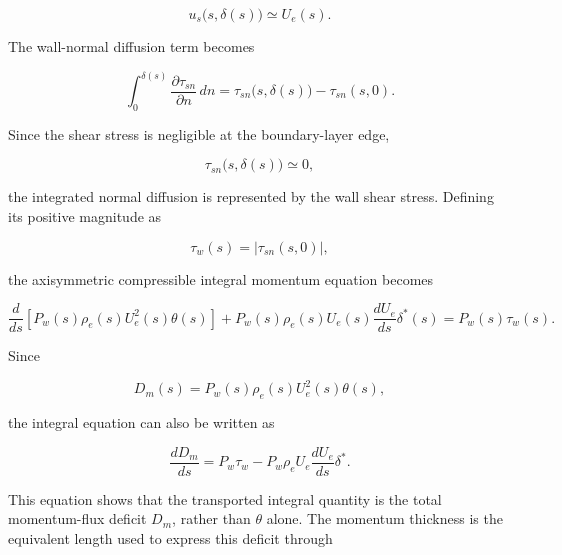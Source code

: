\begin{equation}
    u_s\bigl(s,\delta(s)\bigr)\simeq U_e(s).
\end{equation}

The wall-normal diffusion term becomes

\begin{equation}
    \int_0^{\delta(s)}
    \frac{\partial\tau_{sn}}{\partial n}\,dn
    =
    \tau_{sn}\bigl(s,\delta(s)\bigr)
    -
    \tau_{sn}(s,0).
    \label{eq:integrated_normal_diffusion}
\end{equation}

Since the shear stress is negligible at the boundary-layer edge,

\begin{equation}
    \tau_{sn}\bigl(s,\delta(s)\bigr)\simeq0,
\end{equation}

the integrated normal diffusion is represented by the wall shear stress.
Defining its positive magnitude as

\begin{equation}
    \tau_w(s)
    =
    \left|
        \tau_{sn}(s,0)
    \right|,
    \label{eq:wall_shear_definition}
\end{equation}

the axisymmetric compressible integral momentum equation becomes

\begin{equation}
    \boxed{
    \frac{d}{ds}
    \left[
        P_w(s)\rho_e(s)U_e^2(s)\theta(s)
    \right]
    +
    P_w(s)\rho_e(s)U_e(s)
    \frac{dU_e}{ds}
    \delta^*(s)
    =
    P_w(s)\tau_w(s)
    }.
    \label{eq:axisymmetric_integral_momentum}
\end{equation}

Since

\begin{equation}
    D_m(s)
    =
    P_w(s)\rho_e(s)U_e^2(s)\theta(s),
\end{equation}

the integral equation can also be written as

\begin{equation}
    \boxed{
    \frac{dD_m}{ds}
    =
    P_w\tau_w
    -
    P_w\rho_eU_e
    \frac{dU_e}{ds}\delta^*
    }.
    \label{eq:momentum_deficit_transport}
\end{equation}

This equation shows that the transported integral quantity is the total
momentum-flux deficit \(D_m\), rather than \(\theta\) alone. The momentum
thickness is the equivalent length used to express this deficit through

